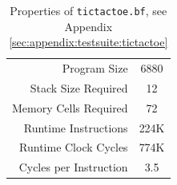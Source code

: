 \begin{table}[H]
  \centering
  \begin{tabular}{r|c}
    Program Size & 6880 \\
    Stack Size Required & 12 \\
    Memory Cells Required & 72 \\
    Runtime Instructions & 224K \\
    Runtime Clock Cycles & 774K \\
    Cycles per Instruction & 3.5 \\
  \end{tabular}
  \caption{Properties of \texttt{tictactoe.bf}, see Appendix \ref{sec:appendix:testsuite:tictactoe}}
  \label{tab:tictactoe}
\end{table}
